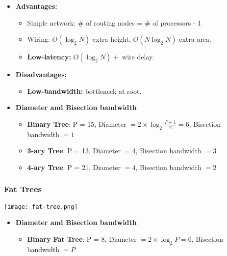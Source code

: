 \documentclass[../main.tex]{subfiles}
\begin{document}
\begin{itemize}
	\item \textbf{Advantages:}
	      \begin{itemize}
		      \item Simple network: \# of routing nodes = \# of processors - 1
		      \item Wiring: \(O(\log_2{N})\) extra height, \(O(N\log_2{N})\) extra area.
		      \item \textbf{Low-latency:} \(O(\log_2{N}) +\) wire delay.
	      \end{itemize}
	\item \textbf{Disadvantages:}
	      \begin{itemize}
		      \item \textbf{Low-bandwidth:} bottleneck at root.
	      \end{itemize}
	\item \textbf{Diameter and Bisection bandwidth}
	      \begin{itemize}
		      \item \textbf{Binary Tree}: P = 15, Diameter \(= 2\times \log_2{\frac{P+1}{2}} = 6\), Bisection bandwidth \(= 1\)
		      \item \textbf{3-ary Tree}: P = 13, Diameter \(= 4\), Bisection bandwidth \(= 3\)
		      \item \textbf{4-ary Tree}: P = 21, Diameter \(= 4\), Bisection bandwidth \(= 2\)
	      \end{itemize}
\end{itemize}


\subsubsection{Fat Trees}


\begin{center}
	\texttt{[image: fat-tree.png]}
\end{center}

\begin{itemize}
	\item \textbf{Diameter and Bisection bandwidth}
	      \begin{itemize}
		      \item \textbf{Binary Fat Tree}: P = 8, Diameter \(= 2\times \log_2{P} = 6\), Bisection bandwidth \(= P\)
	      \end{itemize}
\end{itemize}

\end{document}
